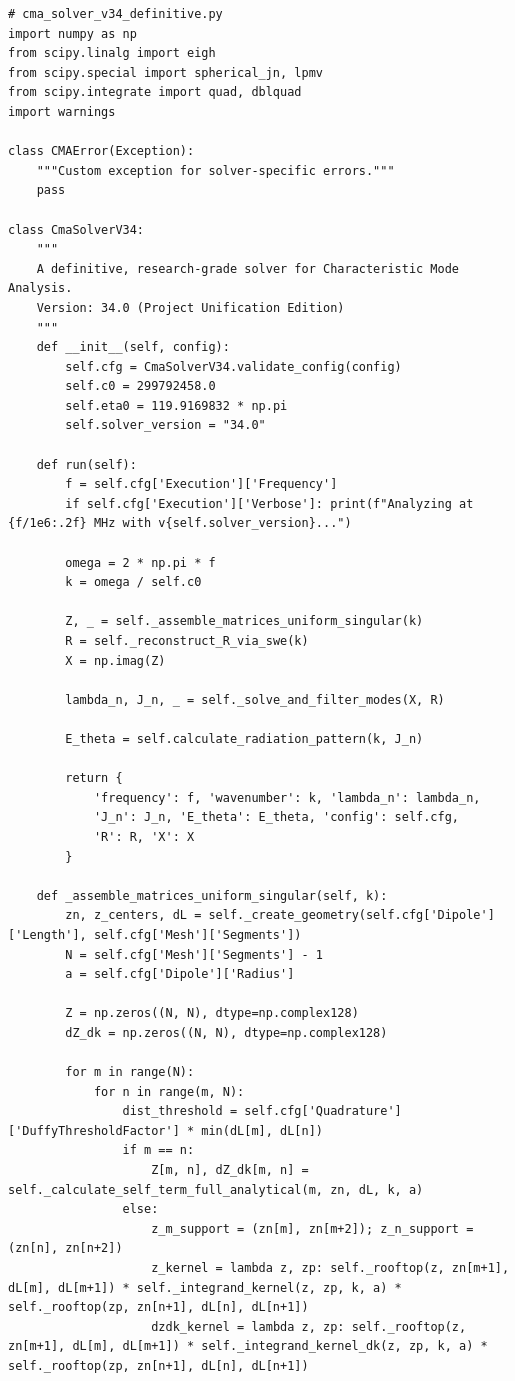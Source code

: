 \documentclass[11pt, a4paper]{report}
\begin{document}
\begin{lstlisting}[caption={The core MoM/CMA solver in Python.}, label={lst:main_cma}]
# cma_solver_v34_definitive.py
import numpy as np
from scipy.linalg import eigh
from scipy.special import spherical_jn, lpmv
from scipy.integrate import quad, dblquad
import warnings

class CMAError(Exception):
    """Custom exception for solver-specific errors."""
    pass

class CmaSolverV34:
    """
    A definitive, research-grade solver for Characteristic Mode Analysis.
    Version: 34.0 (Project Unification Edition)
    """
    def __init__(self, config):
        self.cfg = CmaSolverV34.validate_config(config)
        self.c0 = 299792458.0
        self.eta0 = 119.9169832 * np.pi
        self.solver_version = "34.0"

    def run(self):
        f = self.cfg['Execution']['Frequency']
        if self.cfg['Execution']['Verbose']: print(f"Analyzing at {f/1e6:.2f} MHz with v{self.solver_version}...")

        omega = 2 * np.pi * f
        k = omega / self.c0

        Z, _ = self._assemble_matrices_uniform_singular(k)
        R = self._reconstruct_R_via_swe(k)
        X = np.imag(Z)

        lambda_n, J_n, _ = self._solve_and_filter_modes(X, R)
        
        E_theta = self.calculate_radiation_pattern(k, J_n)

        return {
            'frequency': f, 'wavenumber': k, 'lambda_n': lambda_n,
            'J_n': J_n, 'E_theta': E_theta, 'config': self.cfg,
            'R': R, 'X': X
        }

    def _assemble_matrices_uniform_singular(self, k):
        zn, z_centers, dL = self._create_geometry(self.cfg['Dipole']['Length'], self.cfg['Mesh']['Segments'])
        N = self.cfg['Mesh']['Segments'] - 1
        a = self.cfg['Dipole']['Radius']
        
        Z = np.zeros((N, N), dtype=np.complex128)
        dZ_dk = np.zeros((N, N), dtype=np.complex128)

        for m in range(N):
            for n in range(m, N):
                dist_threshold = self.cfg['Quadrature']['DuffyThresholdFactor'] * min(dL[m], dL[n])
                if m == n:
                    Z[m, n], dZ_dk[m, n] = self._calculate_self_term_full_analytical(m, zn, dL, k, a)
                else:
                    z_m_support = (zn[m], zn[m+2]); z_n_support = (zn[n], zn[n+2])
                    z_kernel = lambda z, zp: self._rooftop(z, zn[m+1], dL[m], dL[m+1]) * self._integrand_kernel(z, zp, k, a) * self._rooftop(zp, zn[n+1], dL[n], dL[n+1])
                    dzdk_kernel = lambda z, zp: self._rooftop(z, zn[m+1], dL[m], dL[m+1]) * self._integrand_kernel_dk(z, zp, k, a) * self._rooftop(zp, zn[n+1], dL[n], dL[n+1])
                    

\end{lstlisting}
\end{document}
